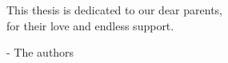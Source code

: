 \begin{dedication}
\null{}

\begin{flushright}
	\begin{calligra}
	\Large 
	This thesis is dedicated to our dear parents,\\
	for their love and endless support.
	\end{calligra}

- The authors
\end{flushright}


\end{dedication}